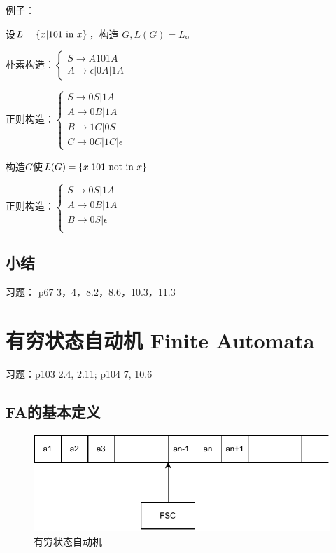 \documentclass{ctexart}
\DeclarePairedDelimiter{\set}{\{}{\}}
\begin{document}
例子：

\begin{outline}[enumerate]
    \1 设$L = \set*{x | 101 \text{ in } x}$，构造 $G, L(G) = L$。

    朴素构造：$\begin{cases}
        S \to A 101 A \\
        A \to \epsilon | 0A | 1A
    \end{cases}$
    
    正则构造：$\begin{cases}
        S \to 0S | 1A \\
        A \to 0B | 1A \\
        B \to 1C | 0S \\
        C \to 0C | 1C | \epsilon
    \end{cases}$

    \1 构造$G$使$L(G) = \set*{x | 101 \text{ not in } x}$

    正则构造：$\begin{cases}
        S \to 0S | 1A \\
        A \to 0B | 1A \\
        B \to 0S | \epsilon\\
    \end{cases}$
\end{outline}



\subsection{小结}


习题： p67 3，4，8.2，8.6，10.3，11.3

\section{有穷状态自动机 Finite Automata}

习题：p103 2.4, 2.11; p104 7, 10.6

\subsection{FA的基本定义}
\begin{figure}[H]
    \centering
    \caption{有穷状态自动机}
    \includegraphics{FA}
\end{figure}
\end{document}
